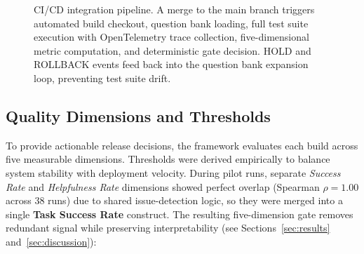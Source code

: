 \begin{figure}[t]
{}
\caption{CI/CD integration pipeline. A merge to the main branch triggers automated build checkout, question bank loading, full test suite execution with OpenTelemetry trace collection, five-dimensional metric computation, and deterministic gate decision. HOLD and ROLLBACK events feed back into the question bank expansion loop, preventing test suite drift.}
\label{fig:cicd_integration}
\end{figure}

\subsection{Quality Dimensions and Thresholds}
To provide actionable release decisions, the framework evaluates each build across five measurable dimensions. Thresholds were derived empirically to balance system stability with deployment velocity. During pilot runs, separate \textit{Success Rate} and \textit{Helpfulness Rate} dimensions showed perfect overlap (Spearman $\rho = 1.00$ across 38 runs) due to shared issue-detection logic, so they were merged into a single \textbf{Task Success Rate} construct. The resulting five-dimension gate removes redundant signal while preserving interpretability (see Sections~\ref{sec:results} and~\ref{sec:discussion}):

